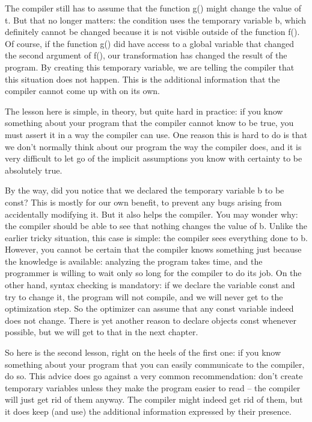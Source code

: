 The compiler still has to assume that the function g() might change the value of t. But that no longer matters: the condition uses the temporary variable b, which definitely cannot be changed because it is not visible outside of the function f(). Of course, if the function g() did have access to a global variable that changed the second argument of f(), our transformation has changed the result of the program. By creating this temporary variable, we are telling the compiler that this situation does not happen. This is the additional information that the compiler cannot come up with on its own. 

The lesson here is simple, in theory, but quite hard in practice: if you know something about your program that the compiler cannot know to be true, you must assert it in a way the compiler can use. One reason this is hard to do is that we don't normally think about our program the way the compiler does, and it is very difficult to let go of the implicit assumptions you know with certainty to be absolutely true. 

By the way, did you notice that we declared the temporary variable b to be const? This is mostly for our own benefit, to prevent any bugs arising from accidentally modifying it. But it also helps the compiler. You may wonder why: the compiler should be able to see that nothing changes the value of b. Unlike the earlier tricky situation, this case is simple: the compiler sees everything done to b. However, you cannot be certain that the compiler knows something just because the knowledge is available: analyzing the program takes time, and the programmer is willing to wait only so long for the compiler to do its job. On the other hand, syntax checking is mandatory: if we declare the variable const and try to change it, the program will not compile, and we will never get to the optimization step. So the optimizer can assume that any const variable indeed does not change. There is yet another reason to declare objects const whenever possible, but we will get to that in the next chapter. 

So here is the second lesson, right on the heels of the first one: if you know something about your program that you can easily communicate to the compiler, do so. This advice does go against a very common recommendation: don't create temporary variables unless they make the program easier to read – the compiler will just get rid of them anyway. The compiler might indeed get rid of them, but it does keep (and use) the additional information expressed by their presence.

